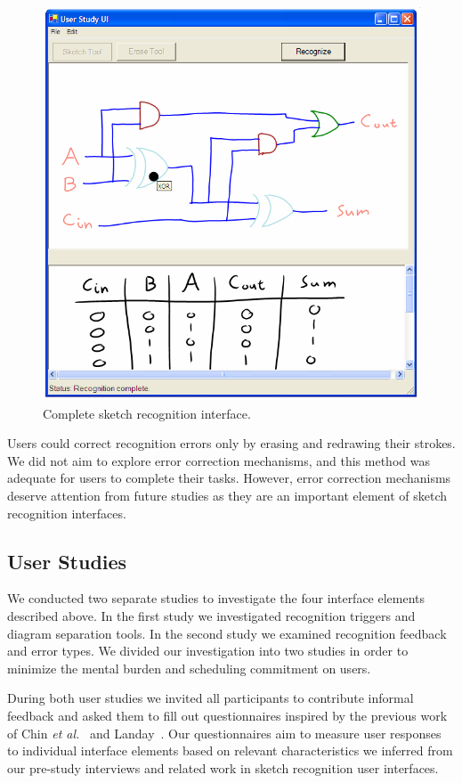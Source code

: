 \documentclass{elsart}
\begin{document}
\begin{figure}[tb]
  \centering \includegraphics[width=0.85\linewidth]{fullGUIdemo.png}
  \caption{Complete sketch recognition interface. }
  \label{fig:fullGUIdemo}
\end{figure}


Users could correct recognition errors only by erasing and redrawing
their strokes.  We did not aim to explore error correction mechanisms,
and this method was adequate for users to complete their tasks.
However, error correction mechanisms deserve attention from future studies as
they are an important element of sketch recognition interfaces.




\subsection{User Studies}
\label{sec:design}
We conducted two separate studies to investigate the four interface
elements described above. In the first study we investigated
recognition triggers and diagram separation tools.  In the second
study we examined recognition feedback and error types. We divided our
investigation into two studies in order to minimize the mental burden and
scheduling commitment on users.

During both user studies we invited all participants to contribute
informal feedback and asked them to fill out questionnaires inspired
by the previous work of Chin \textit{et al.}~\cite{chin88} and
Landay~\cite{landay96thesis}.  Our questionnaires aim to measure user
responses to individual interface elements based on relevant
characteristics we inferred from our pre-study interviews and related
work in sketch recognition user interfaces.
\end{document}
